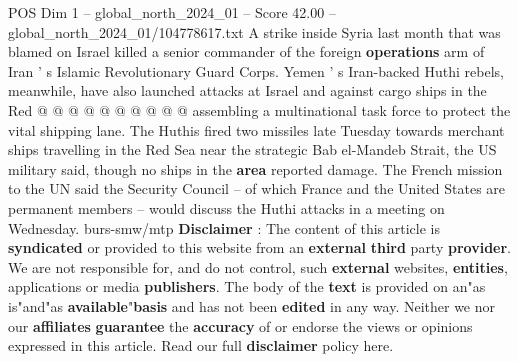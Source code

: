 \begin{textsample}{POS Dim 1 – global\_north\_2024\_01 – Score 42.00 – global\_north\_2024\_01/104778617.txt}
A strike inside Syria last month that was blamed on Israel killed a senior commander of the foreign \textbf{operations} arm of Iran ' s Islamic Revolutionary Guard Corps.
Yemen ' s Iran-backed Huthi rebels, meanwhile, have also launched attacks at Israel and against cargo ships in the Red @ @ @ @ @ @ @ @ @ @ assembling a multinational task force to protect the vital shipping lane.
The Huthis fired two missiles late Tuesday towards merchant ships travelling in the Red Sea near the strategic Bab el-Mandeb Strait, the US military said, though no ships in the \textbf{area} reported damage.
The French mission to the UN said the Security Council -- of which France and the United States are permanent members -- would discuss the Huthi attacks in a meeting on Wednesday. burs-smw/mtp \textbf{Disclaimer} : The content of this article is \textbf{syndicated} or provided to this website from an \textbf{external} \textbf{third} party \textbf{provider}.
We are not responsible for, and do not control, such \textbf{external} websites, \textbf{entities}, applications or media \textbf{publishers}.
The body of the \textbf{text} is provided on an"as is"and"as \textbf{available}"\textbf{basis} and has not been \textbf{edited} in any way.
Neither we nor our \textbf{affiliates} \textbf{guarantee} the \textbf{accuracy} of or endorse the views or opinions expressed in this article.
Read our full \textbf{disclaimer} policy here.

\end{textsample}
